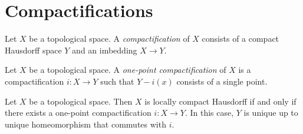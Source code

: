 \section{Compactifications}

\begin{definition}[Compactification]
    Let $X$ be a topological space. A \emph{compactification} of $X$ consists of a compact Hausdorff
    space $Y$ and an imbedding $X \rightarrow Y$.
\end{definition}

\begin{definition}
    Let $X$ be a topological space. A \emph{one-point compactification} of $X$ is a compactification
    $i : X \rightarrow Y$ such that $Y - i(x)$ consists of a single point.
\end{definition}

\begin{theorem}
    Let $X$ be a topological space. Then $X$ is locally compact Hausdorff if and only if there exists
    a one-point compactification $i : X \rightarrow Y$. In this case,
    $Y$ is unique up to unique homeomorphism that commutes with $i$.
\end{theorem}

